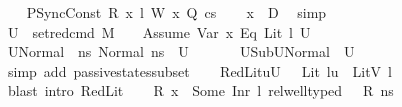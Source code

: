 \begin{isabellebody}
\isanewline
\ \ \isamarkupfalse%
\ {\isacharparenleft}{\kern0pt}PSyncConst\ R\ x\ l\ W\ x{}\ Q\ cs{\isacharparenright}{\kern0pt}\isanewline
\ \ \isamarkupfalse%
\ {\isachardoublequoteopen}x{}\ {\isasymnotin}\ D{}{\isachardoublequoteclose}\ \isamarkupfalse%
\ simp\isanewline
\ \ \isamarkupfalse%
\ {\isacharquery}{\kern0pt}U{}\ {\isacharequal}{\kern0pt}\ {\isachardoublequoteopen}{\isacharparenleft}{\kern0pt}set{\isacharunderscore}{\kern0pt}red{\isacharunderscore}{\kern0pt}cmd\ M\ {\isasymLambda}{\isacharprime}{\kern0pt}\ {\isasymGamma}\ {\isasymOmega}\ {\isacharparenleft}{\kern0pt}Assume\ {\isacharparenleft}{\kern0pt}{\isacharparenleft}{\kern0pt}Var\ x{}{\isacharparenright}{\kern0pt}\ {\isasymguillemotleft}Eq{\isasymguillemotright}\ {\isacharparenleft}{\kern0pt}Lit\ l{\isacharparenright}{\kern0pt}{\isacharparenright}{\kern0pt}{\isacharparenright}{\kern0pt}\ U{}{\isacharparenright}{\kern0pt}{\isachardoublequoteclose}\isanewline
\ \ \isamarkupfalse%
\ {\isacharquery}{\kern0pt}U{}Normal\ {\isacharequal}{\kern0pt}\ {\isachardoublequoteopen}{\isacharbraceleft}{\kern0pt}ns{\isachardot}{\kern0pt}\ Normal\ ns\ {\isasymin}\ {\isacharquery}{\kern0pt}U{}{\isacharbraceright}{\kern0pt}{\isachardoublequoteclose}\ \ \ \isanewline
\ \ \isamarkupfalse%
\ U{}Sub{\isacharcolon}{\kern0pt}{\isachardoublequoteopen}{\isacharquery}{\kern0pt}U{}Normal\ {\isasymsubseteq}\ U{}{\isachardoublequoteclose}\isanewline
\ \ \ \ \isamarkupfalse%
\ {\isacharparenleft}{\kern0pt}simp\ add{\isacharcolon}{\kern0pt}\ passive{\isacharunderscore}{\kern0pt}states{\isacharunderscore}{\kern0pt}subset{\isacharparenright}{\kern0pt}\isanewline
\ \ \isamarkupfalse%
\ RedLit{\isacharcolon}{\kern0pt}{\isachardoublequoteopen}{\isasymforall}u{\isasymin}U{}{\isachardot}{\kern0pt}\ {\isasymLambda}{\isacharprime}{\kern0pt}{\isacharcomma}{\kern0pt}{\isasymGamma}{\isacharcomma}{\kern0pt}{\isasymOmega}\ {\isasymturnstile}\ {\isasymlangle}Lit\ l{\isacharcomma}{\kern0pt}u{\isasymrangle}\ {\isasymDown}\ {\isacharparenleft}{\kern0pt}LitV\ l{\isacharparenright}{\kern0pt}{\isachardoublequoteclose}\ \ \ \ \ \ \ \ \isanewline
\ \ \ \ \isamarkupfalse%
\ {\isacharparenleft}{\kern0pt}blast\ intro{\isacharcolon}{\kern0pt}\ RedLit{\isacharparenright}{\kern0pt}\isanewline
\ \ \isamarkupfalse%
\ {\isacartoucheopen}R\ x\ {\isacharequal}{\kern0pt}\ Some\ {\isacharparenleft}{\kern0pt}Inr\ l{\isacharparenright}{\kern0pt}{\isacartoucheclose}\ {\isacartoucheopen}rel{\isacharunderscore}{\kern0pt}well{\isacharunderscore}{\kern0pt}typed\ {\isasymLambda}\ {\isasymOmega}\ R\ ns{\isacartoucheclose}\ \isamarkupfalse%

\end{isabellebody}
